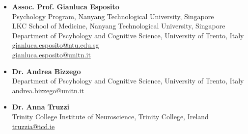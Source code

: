 \documentclass[10pt,a4paper]{altacv}
\begin{document}
\begin{fullwidth}
		
		\begin{itemize}
			\item \textbf{Assoc. Prof. Gianluca Esposito}\\
			Psychology Program, Nanyang Technological University, Singapore\\
			LKC School of Medicine, Nanyang Technological University, Singapore\\
			Department of Pscyhology and Cognitive Science, University of Trento, Italy\\
			\href{mailto:gianluca.esposito@ntu.edu.sg}{gianluca.esposito@ntu.edu.sg}\\
			\href{mailto:gianluca.esposito@unitn.it}{gianluca.esposito@unitn.it}

			\item \textbf{Dr. Andrea Bizzego}\\
			Department of Pscyhology and Cognitive Science, University of Trento, Italy\\
			\href{mailto:andrea.bizzego@unitn.it}{andrea.bizzego@unitn.it}
			
			\item \textbf{Dr. Anna Truzzi}\\
			Trinity College Institute of Neuroscience, Trinity College, Ireland\\
			\href{mailto:truzzia@tcd.ie}{truzzia@tcd.ie}

		\end{itemize}
		
	\end{fullwidth}
	
\end{document}
